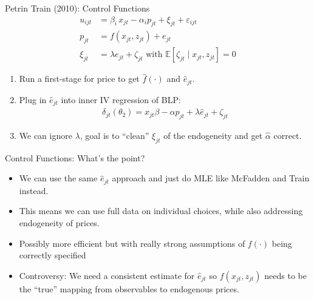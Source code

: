 \documentclass[aspectratio=169,10pt]{beamer}
\begin{document}
\begin{frame}{Petrin Train (2010): Control Functions}
\begin{align*}
u_{ijt} &=  \beta_i\, x_{jt} - \alpha_i p_{jt} + \xi_{jt} + \varepsilon_{ijt} \\
p_{jt} &= f(x_{jt}, z_{jt}) + e_{jt}\\
\xi_{jt} &= \lambda e_{jt} + \zeta_{jt}  \text{ with } \mathbb{E}[\zeta_{jt} \mid  x_{jt}, z_{jt}]=0 
\end{align*}
\begin{enumerate}
\item Run a first-stage for price to get $\hat{f}(\cdot)$ and $\hat{e}_{jt}$.
\item Plug in $\hat{e}_{jt}$ into inner IV regression of BLP:
\begin{align*}
\delta_{jt}(\theta_2) = x_{jt} \beta -\alpha p_{jt}+ \lambda \hat{e}_{jt} + \zeta_{jt}
 \end{align*}
 \item We can ignore $\lambda$, goal is to ``clean'' $\xi_{jt}$ of the endogeneity and get $\widehat{\alpha}$ correct.
\end{enumerate}
\end{frame}


\begin{frame}{Control Functions: What's the point?}
\begin{itemize}
\item We can use the same $\hat{e}_{jt}$ approach and just do MLE like McFadden and Train instead.
\item This means we can use full data on individual choices, while also addressing endogeneity of prices.
\item Possibly more efficient but with really strong assumptions of $f(\cdot)$ being correctly specified
\item Controversy: We need a consistent estimate for $\hat{e}_{jt}$ so $f(x_{jt}, z_{jt})$ needs to be the ``true'' mapping from observables to endogenous prices.
\end{itemize}
\end{frame}
\end{document}
